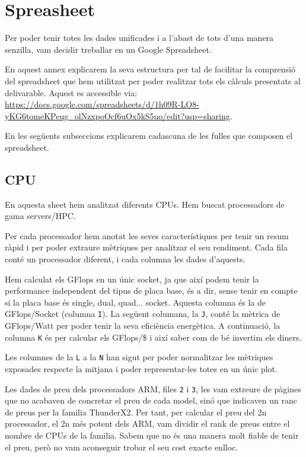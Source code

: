 \appendix
\section{Spreasheet}
Per poder tenir totes les dades unificades i a l'abast de tots d'una manera senzilla, vam decidir treballar en un Google Spreadsheet. 

En aquest annex explicarem la seva estructura per tal de facilitar la comprensió del spreadsheet que hem utilitzat per poder realitzar tots els càlculs presentats al delivarable. Aquest es accessible via: \url{https://docs.google.com/spreadsheets/d/1h09R-LO8-yKG6tomeKPeug\_olNzxpoOcf6uOx5kS5uo/edit?usp=sharing}.

En les següents subseccions explicarem cadascuna de les fulles que composen el spreadsheet.

\subsection{CPU}
En aquesta sheet hem analitzat diferents CPUs. Hem buscat processadors de gama servers/HPC. 

Per cada processador hem anotat les seves característiques per tenir un resum ràpid i per poder extraure mètriques per analitzar el seu rendiment. Cada fila conté un processador diferent, i cada columna les dades d'aquests.

Hem calculat els GFlops en un únic socket, ja que així podem tenir la performance independent del tipus de placa base, és a dir, sense tenir en compte si la placa base és single, dual, quad... socket. 
Aquesta columna és la de GFlops/Socket (columna \texttt{I}). La següent columana, la \texttt{J}, conté la mètrica de GFlops/Watt per poder tenir la seva eficiència energètica. A continuació, la columna \texttt{K} és per calcular els GFlops/\$ i així saber com de bé invertim els diners.

Les columnes de la \texttt{L} a la \texttt{N} han sigut per poder normalitzar les mètriques exposades respecte la mitjana i poder representar-les totes en un únic plot.

Les dades de preu dels processadors ARM, files \texttt{2} i \texttt{3}, les vam extreure de pàgines que no acabaven de concretar el preu de cada model, sinó que indicaven un ranc de preus per la familia ThunderX2. Per tant, per calcular el preu del 2n processador, el 2n més potent dels ARM, vam dividir el rank de preus entre el nombre de CPUs de la familia. Sabem que no és una manera molt fiable de tenir el preu, però no vam aconseguir trobar el seu cost exacte enlloc.

